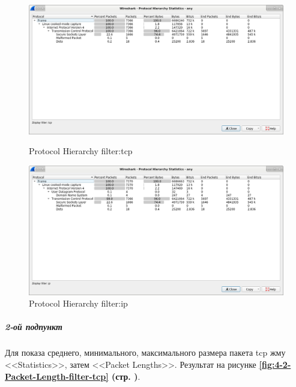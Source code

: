 \begin{figure}[!htp]
    \centering
    \begin{minipage}{.49\textwidth}
        \centering
        \includegraphics[width=.99\textwidth]
        {../_INCLUDES/main/task4/4-1-Protocol-Hierarchy-tcp.png}
        \caption{Protocol Hierarchy filter:tcp}
        \label{fig:4-1-Protocol-Hierarchy-tcp}
    \end{minipage}
    \begin{minipage}{.49\textwidth}
        \centering
        \includegraphics[width=.99\textwidth]
        {../_INCLUDES/main/task4/4-1-Protocol-Hierarchy-ip.png}
        \caption{Protocol Hierarchy filter:ip}
        \label{fig:4-1-Protocol-Hierarchy-ip}
    \end{minipage}
\end{figure}

\newpage

\subparagraph{2-ой подпункт} \hspace{0pt}

Для показа среднего, минимального, максимального размера пакета tcp
жму <<Statistics>>, затем <<Packet Lengths>>.
Результат на рисунке \textbf{\ref{fig:4-2-Packet-Length-filter-tcp} (стр. \pageref{fig:4-2-Packet-Length-filter-tcp})}.

